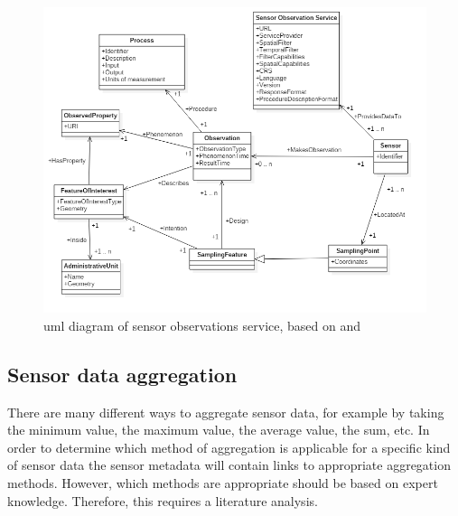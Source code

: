\begin{figure}
	\centering
	\includegraphics[width=1\linewidth]{figs/UML_Diagram.png}
	\caption{\ac{uml} diagram of sensor observations service, based on \cite{SSW:Cox3} and \cite{SDI:INSPIRE2}}
	\label{fig:UML}
\end{figure}

\subsection{Sensor data aggregation}
There are many different ways to aggregate sensor data, for example by taking the minimum value, the maximum value, the average value, the sum, etc. In order to determine which method of aggregation is applicable for a specific kind of sensor data the sensor metadata will contain links to appropriate aggregation methods. However, which methods are appropriate should be based on expert knowledge. Therefore, this requires a literature analysis. 



